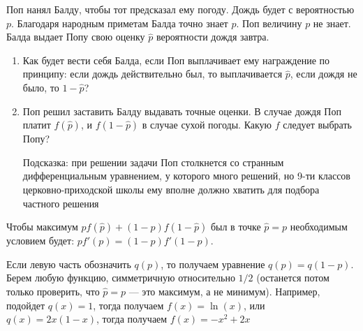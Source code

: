 \begin{problem}
Поп нанял Балду, чтобы тот предсказал ему погоду. Дождь будет с
вероятностью $p$. Благодаря народным приметам Балда точно знает
$p$. Поп величину $p$ не знает. Балда выдает Попу
свою оценку $\hat{p}$ вероятности дождя завтра. \par
\begin{enumerate}
\item  Как будет вести себя Балда, если Поп выплачивает ему
награждение по принципу: если дождь действительно был, то
выплачивается $\hat{p}$, если дождя не было, то
$1-\hat{p}$? \par
\item Поп решил заставить Балду выдавать точные оценки. В случае
дождя Поп платит $f(\hat{p})$, и $f(1-\hat{p})$ в случае
сухой погоды. Какую $f$ следует выбрать Попу? \par
Подсказка: при решении задачи Поп столкнется со странным
дифференциальным уравнением, у которого много решений, но 9-ти
классов церковно-приходской школы ему вполне должно хватить для
подбора частного решения
\end{enumerate}


\begin{sol}

Чтобы максимум $p f(\hat{p})+(1-p)f(1-\hat{p})$ был в точке
$\hat{p}=p$ необходимым условием будет:
$pf'(p)=(1-p)f'(1-p)$. \par
Если левую часть обозначить $q(p)$, то получаем уравнение
$q(p)=q(1-p)$. Берем любую функцию, симметричную относительно
$1/2$ (останется потом только проверить, что $\hat{p}=p$ --- это
максимум, а не минимум). Например, подойдет $q(x)=1$, тогда
получаем $f(x)=\ln(x)$, или $q(x)=2x(1-x)$, тогда получаем
$f(x)=-x^{2}+2x$
\end{sol}
\end{problem}



